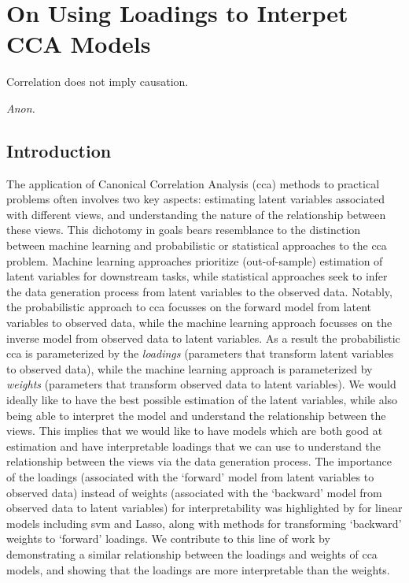 \graphicspath{{chapters/loadings/}}
\chapter{On Using Loadings to Interpet CCA Models}\label{chap:loadings}
\epigraph{Correlation does not imply causation.}{\textit{Anon.}}
\minitoc
\section{Introduction}

The application of Canonical Correlation Analysis (\acrshort{cca}) methods to practical problems often involves two key aspects: estimating latent variables associated with different views, and understanding the nature of the relationship between these views.
This dichotomy in goals bears resemblance to the distinction between machine learning and probabilistic or statistical approaches to the \acrshort{cca} problem.
Machine learning approaches prioritize (out-of-sample) estimation of latent variables for downstream tasks, while statistical approaches seek to infer the data generation process from latent variables to the observed data.
Notably, the probabilistic approach to \acrshort{cca} focusses on the forward model from latent variables to observed data, while the machine learning approach focusses on the inverse model from observed data to latent variables.
As a result the probabilistic \acrshort{cca} is parameterized by the \textit{loadings} (parameters that transform latent variables to observed data), while the machine learning approach is parameterized by \textit{weights} (parameters that transform observed data to latent variables).
We would ideally like to have the best possible estimation of the latent variables, while also being able to interpret the model and understand the relationship between the views.
This implies that we would like to have models which are both good at estimation and have interpretable \gls{loadings} that we can use to understand the relationship between the views via the data generation process.
The importance of the \gls{loadings} (associated with the `forward' model from latent variables to observed data) instead of weights (associated with the `backward' model from observed data to latent variables) for interpretability was highlighted by \cite{haufe2014interpretation} for linear models including \acrshort{svm} and Lasso, along with methods for transforming `backward' weights to `forward' loadings.
We contribute to this line of work by demonstrating a similar relationship between the \gls{loadings} and weights of \acrshort{cca} models, and showing that the \gls{loadings} are more interpretable than the weights.

